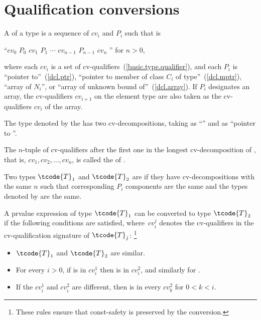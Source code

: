 \section[conv.qual]{Qualification conversions}

%
\pnum
A  of a type 
is a sequence of
$cv_i$ and $P_i$
such that  is
\begin{indented}
``$cv_0$ $P_0$ $cv_1$ $P_1$ $\cdots$ $cv_{n-1}$ $P_{n-1}$ $cv_n$ '' for $n > 0$,
\end{indented}
where
each $cv_i$ is a set of cv-qualifiers~(\ref{basic.type.qualifier}), and
each $P_i$ is
``pointer to''~(\ref{dcl.ptr}),
``pointer to member of class $C_i$ of type''~(\ref{dcl.mptr}),
``array of $N_i$'', or
``array of unknown bound of''~(\ref{dcl.array}).
If $P_i$ designates an array,
the cv-qualifiers $cv_{i+1}$ on the element type are also taken as
the cv-qualifiers $cv_i$ of the array.
\begin{example}
The type denoted by the  
has two cv-decompositions,
taking  as ``'' and as ``pointer to ''.
\end{example}
The $n$-tuple of cv-qualifiers after the first one
in the longest cv-decomposition of , that is,
$cv_1, cv_2, \dotsc, cv_n$, is called the
 of .

\pnum
{}%
Two types $\tcode{T}_1$ and $\tcode{T}_2$ are  if
they have cv-decompositions with the same $n$
such that corresponding $P_i$ components are the same
and the types denoted by  are the same.

\pnum
A prvalue expression of type $\tcode{T}_1$
can be converted to type $\tcode{T}_2$
if the following conditions are satisfied,
where~$cv_i^j$ denotes the cv-qualifiers in the cv-qualification signature of $\tcode{T}_j$:%
\footnote{These rules ensure that const-safety is preserved by the conversion.}

\begin{itemize}
\item $\tcode{T}_1$ and $\tcode{T}_2$ are similar.

\item For every $i > 0$, if  is in $\mathit{cv}_i^1$ then  is in $\mathit{cv}_i^2$, and similarly for .

\item If the $\mathit{cv}_i^1$ and $\mathit{cv}_i^2$ are different,
then  is in every $\mathit{cv}_k^2$ for $0 < k < i$.
\end{itemize}

